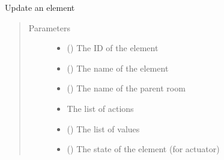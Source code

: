 \documentclass[letterpaper,10pt,english]{sphinxmanual}
\begin{document}
\begin{fulllineitems}
\begin{fulllineitems}
\label{\detokenize{index:Api.Api.update_element}}
\sphinxAtStartPar
Update an element
\begin{quote}\begin{description}
\item[{Parameters}] \leavevmode\begin{itemize}
\item {} 
\sphinxAtStartPar
{} () \textendash{} The ID of the element

\item {} 
\sphinxAtStartPar
{} () \textendash{} The name of the element

\item {} 
\sphinxAtStartPar
{} () \textendash{} The name of the parent room

\item {} 
\sphinxAtStartPar
{} \textendash{} The list of actions

\item {} 
\sphinxAtStartPar
{} () \textendash{} The list of values

\item {} 
\sphinxAtStartPar
{} () \textendash{} The state of the element (for actuator)

\end{itemize}


\end{description}
\end{quote}
\end{fulllineitems}
\end{fulllineitems}
\end{document}
